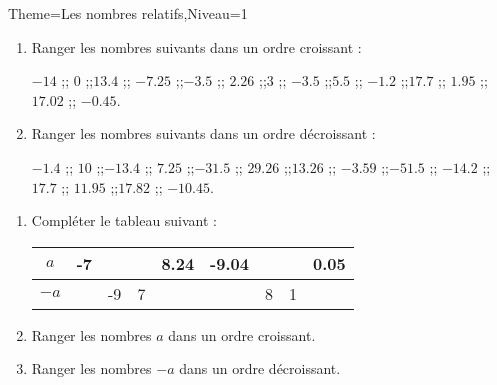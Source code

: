 \documentclass[a4paper,12pt]{article}
\begin{document}
\begin{Maquette}[Fiche]{Theme=Les nombres relatifs,Niveau=1}
\begin{exercice}
\begin{enumerate}
\item Ranger les nombres suivants dans un ordre croissant :

$-14 $ ;; $0 $ ;;$13.4 $ ;; $-7.25 $ ;;$-3.5 $ ;; $2.26 $ ;;$ 3$ ;; $-3.5 $ ;;$5.5 $ ;; $-1.2 $ ;;$ 17.7$ ;; $1.95 $ ;;$ 17.02$ ;; $-0.45 $.
\item Ranger les nombres suivants dans un ordre décroissant :

$-1.4 $ ;; $10 $ ;;$-13.4 $ ;; $7.25 $ ;;$-31.5 $ ;; $29.26 $ ;;$ 13.26$ ;; $-3.59 $ ;;$-51.5 $ ;; $-14.2 $ ;;$ 17.7$ ;; $11.95 $ ;;$ 17.82$ ;; $-10.45 $.
\end{enumerate}

\end{exercice}

\begin{exercice}
\begin{enumerate}
\item Compléter le tableau suivant :

\begin{tabular}{|c|c|c|c|c|c|c|c|c|}
\hline 
$a$ & -7 &  &  & 8.24 & -9.04 &  &  & 0.05 \\ 
\hline 
$-a$ &  & -9 & 7 &  &  & 8 & 1 &  \\ 
\hline 
\end{tabular} 
\item Ranger les nombres $a$ dans un ordre croissant.
\item Ranger les nombres $-a$ dans un ordre décroissant.
\end{enumerate}
\end{exercice}

\end{Maquette}
\end{document}
